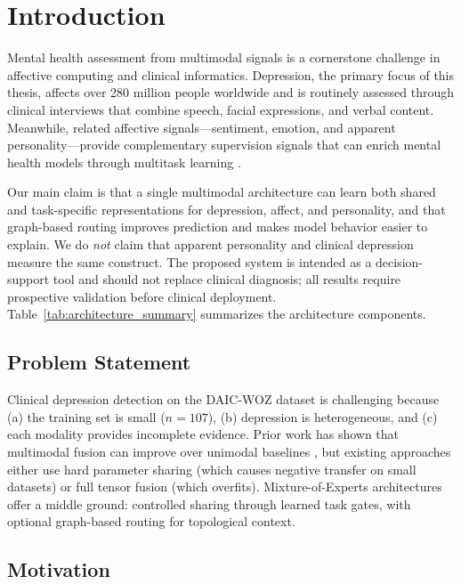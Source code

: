 \documentclass[12pt,oneside]{book}
\begin{document}
\section{Introduction}

Mental health assessment from multimodal signals is a cornerstone challenge in affective computing and clinical informatics. Depression, the primary focus of this thesis, affects over 280 million people worldwide \citep{who2023depression} and is routinely assessed through clinical interviews that combine speech, facial expressions, and verbal content. Meanwhile, related affective signals---sentiment, emotion, and apparent personality---provide complementary supervision signals that can enrich mental health models through multitask learning \citep{kendall2018multitask}.

Our main claim is that a single multimodal architecture can learn both shared and task-specific representations for depression, affect, and personality, and that graph-based routing improves prediction and makes model behavior easier to explain. We do \emph{not} claim that apparent personality and clinical depression measure the same construct. The proposed system is intended as a decision-support tool and should not replace clinical diagnosis; all results require prospective validation before clinical deployment. Table~\ref{tab:architecture_summary} summarizes the architecture components.



\subsection{Problem Statement}

Clinical depression detection on the DAIC-WOZ dataset \citep{gratch2014distress} is challenging because (a) the training set is small ($n=107$), (b) depression is heterogeneous, and (c) each modality provides incomplete evidence. Prior work has shown that multimodal fusion can improve over unimodal baselines \citep{niu2021multimodal}, but existing approaches either use hard parameter sharing (which causes negative transfer on small datasets) or full tensor fusion (which overfits). Mixture-of-Experts architectures \citep{shazeer2017moe,jacobs2024mmoe} offer a middle ground: controlled sharing through learned task gates, with optional graph-based routing for topological context.

\subsection{Motivation}
\label{sec:motivation}
\end{document}
